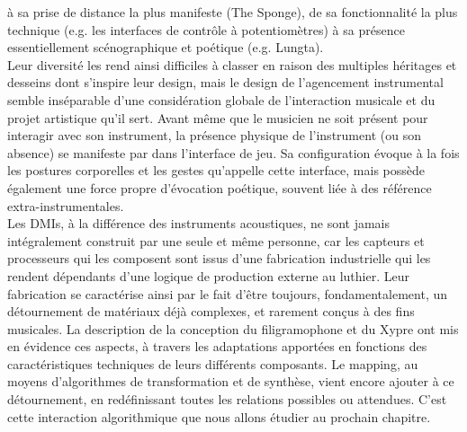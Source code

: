 à sa prise de distance la plus manifeste (The Sponge), de sa fonctionnalité la plus technique (e.g. les interfaces de contrôle à potentiomètres) à sa présence essentiellement scénographique et poétique (e.g. Lungta).\\
\indent Leur diversité les rend ainsi difficiles à classer en raison des multiples héritages et desseins dont s'inspire leur design, mais le design de l'agencement instrumental semble inséparable d'une considération globale de l'interaction musicale et du projet artistique qu'il sert. Avant même que le musicien ne soit présent pour interagir avec son instrument, la présence physique de l'instrument (ou son absence) se manifeste par dans l'interface de jeu. Sa configuration évoque à la fois les postures corporelles et les gestes qu'appelle cette interface, mais possède également une force propre d'évocation poétique, souvent liée à des référence extra-instrumentales.\\
\indent Les \glspl{DMI}, à la différence des instruments acoustiques, ne sont jamais intégralement construit par une seule et même personne, car les capteurs et processeurs qui les composent sont issus d'une fabrication industrielle qui les rendent dépendants d'une logique de production externe au luthier. Leur fabrication se caractérise ainsi par le fait d'être toujours, fondamentalement, un détournement de matériaux déjà complexes, et rarement conçus à des fins musicales. La description de la conception du filigramophone et du Xypre ont mis en évidence ces aspects, à travers les adaptations apportées en fonctions des caractéristiques techniques de leurs différents composants. Le mapping, au moyens d'algorithmes de transformation et de synthèse, vient encore ajouter à ce détournement, en redéfinissant toutes les relations possibles ou attendues. C'est cette interaction algorithmique que nous allons étudier au prochain chapitre.







